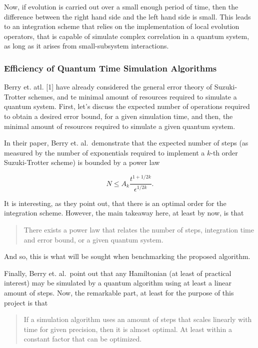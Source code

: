 \noindent Now, if evolution is carried out over a small enough period of time,
then the difference between the right hand side and the left hand side
is small. This leads to an integration scheme that relies on the
implementation of local evolution operators, that is capable of simulate
complex correlation in a quantum system, as long as it arises from
small-subsystem interactions.

    \hypertarget{efficiency-of-quantum-time-simulation-algorithms}{%
\subsubsection{Efficiency of Quantum Time Simulation
Algorithms}\label{efficiency-of-quantum-time-simulation-algorithms}}

Berry et. atl. {[}1{]} have already considered the general error theory
of Suzuki-Trotter schemes, and te minimal amount of resources required
to simulate a quantum system. First, let's discuss the expected number
of operations required to obtain a desired error bound, for a given
simulation time, and then, the minimal amount of resources required to
simulate a given quantum system.

In their paper, Berry et. al.~demonstrate that the expected number of
steps (as measured by the number of exponentials required to implement a
\(k\)-th order Suzuki-Trotter scheme) is bounded by a power law

\[
N \leq A_k \frac{t^{1+1/2k}}{\epsilon^{1/2k}}.
\]

It is interesting, as they point out, that there is an optimal order for
the integration scheme. However, the main takeaway here, at least by
now, is that

\begin{quote}
There exists a power law that relates the number of steps, integration
time and error bound, or a given quantum system.
\end{quote}

And so, this is what will be sought when benchmarking the proposed
algorithm.

Finally, Berry et. al.~point out that any Hamiltonian (at least of
practical interest) may be simulated by a quantum algorithm using at
least a linear amount of steps. Now, the remarkable part, at least for
the purpose of this project is that

\begin{quote}
If a simulation algorithm uses an amount of steps that scales linearly
with time for given precision, then it is almost optimal. At least
within a constant factor that can be optimized.
\end{quote}

